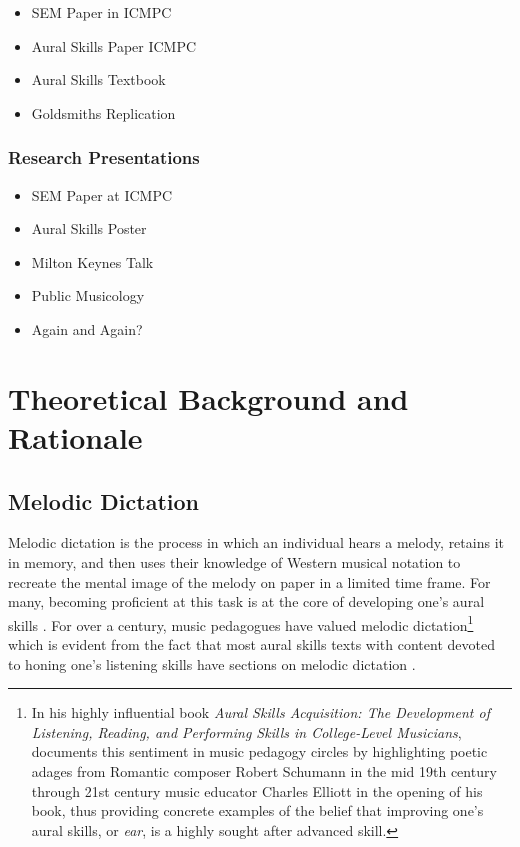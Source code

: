 \documentclass[]{book}
\providecommand{\tightlist}{%
  \setlength{\itemsep}{0pt}\setlength{\parskip}{0pt}}
\let\rmarkdownfootnote\footnote%
\def\footnote{\protect\rmarkdownfootnote}
\begin{document}
\begin{itemize}
\tightlist
\item
  SEM Paper in ICMPC
\item
  Aural Skills Paper ICMPC
\item
  Aural Skills Textbook
\item
  Goldsmiths Replication
\end{itemize}

\hypertarget{research-presentations}{%
\subsection{Research Presentations}\label{research-presentations}}

\begin{itemize}
\tightlist
\item
  SEM Paper at ICMPC
\item
  Aural Skills Poster
\item
  Milton Keynes Talk
\item
  Public Musicology
\item
  Again and Again?
\end{itemize}

\hypertarget{intro}{%
\chapter{Theoretical Background and Rationale}\label{intro}}

\hypertarget{melodic-dictation}{%
\section{Melodic Dictation}\label{melodic-dictation}}

Melodic dictation is the process in which an individual hears a melody, retains it in memory, and then uses their knowledge of Western musical notation to recreate the mental image of the melody on paper in a limited time frame.
For many, becoming proficient at this task is at the core of developing one's aural skills \citep{karpinskiModelMusicPerception1990}.
For over a century, music pedagogues have valued melodic dictation\footnote{In his highly influential book \emph{Aural Skills Acquisition: The Development of Listening, Reading, and Performing Skills in College-Level Musicians}, \citet{karpinskiAuralSkillsAcquisition2000} documents this sentiment in music pedagogy circles by highlighting poetic adages from Romantic composer Robert Schumann in the mid 19th century through 21st century music educator Charles Elliott in the opening of his book, thus providing concrete examples of the belief that improving one's aural skills, or \emph{ear}, is a highly sought after advanced skill.} which is evident from the fact that most aural skills texts with content devoted to honing one's listening skills have sections on melodic dictation \citep{karpinskiAuralSkillsAcquisition2000}.
\end{document}
